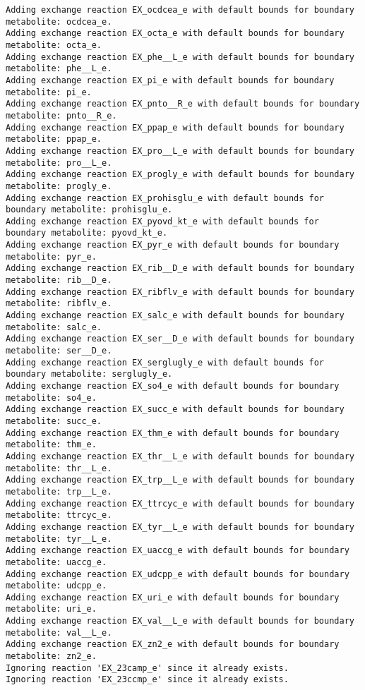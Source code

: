 \documentclass[
  letterpaper,
  DIV=11,
  numbers=noendperiod]{scrartcl}
\begin{document}
\begin{verbatim}
Adding exchange reaction EX_ocdcea_e with default bounds for boundary metabolite: ocdcea_e.
Adding exchange reaction EX_octa_e with default bounds for boundary metabolite: octa_e.
Adding exchange reaction EX_phe__L_e with default bounds for boundary metabolite: phe__L_e.
Adding exchange reaction EX_pi_e with default bounds for boundary metabolite: pi_e.
Adding exchange reaction EX_pnto__R_e with default bounds for boundary metabolite: pnto__R_e.
Adding exchange reaction EX_ppap_e with default bounds for boundary metabolite: ppap_e.
Adding exchange reaction EX_pro__L_e with default bounds for boundary metabolite: pro__L_e.
Adding exchange reaction EX_progly_e with default bounds for boundary metabolite: progly_e.
Adding exchange reaction EX_prohisglu_e with default bounds for boundary metabolite: prohisglu_e.
Adding exchange reaction EX_pyovd_kt_e with default bounds for boundary metabolite: pyovd_kt_e.
Adding exchange reaction EX_pyr_e with default bounds for boundary metabolite: pyr_e.
Adding exchange reaction EX_rib__D_e with default bounds for boundary metabolite: rib__D_e.
Adding exchange reaction EX_ribflv_e with default bounds for boundary metabolite: ribflv_e.
Adding exchange reaction EX_salc_e with default bounds for boundary metabolite: salc_e.
Adding exchange reaction EX_ser__D_e with default bounds for boundary metabolite: ser__D_e.
Adding exchange reaction EX_serglugly_e with default bounds for boundary metabolite: serglugly_e.
Adding exchange reaction EX_so4_e with default bounds for boundary metabolite: so4_e.
Adding exchange reaction EX_succ_e with default bounds for boundary metabolite: succ_e.
Adding exchange reaction EX_thm_e with default bounds for boundary metabolite: thm_e.
Adding exchange reaction EX_thr__L_e with default bounds for boundary metabolite: thr__L_e.
Adding exchange reaction EX_trp__L_e with default bounds for boundary metabolite: trp__L_e.
Adding exchange reaction EX_ttrcyc_e with default bounds for boundary metabolite: ttrcyc_e.
Adding exchange reaction EX_tyr__L_e with default bounds for boundary metabolite: tyr__L_e.
Adding exchange reaction EX_uaccg_e with default bounds for boundary metabolite: uaccg_e.
Adding exchange reaction EX_udcpp_e with default bounds for boundary metabolite: udcpp_e.
Adding exchange reaction EX_uri_e with default bounds for boundary metabolite: uri_e.
Adding exchange reaction EX_val__L_e with default bounds for boundary metabolite: val__L_e.
Adding exchange reaction EX_zn2_e with default bounds for boundary metabolite: zn2_e.
Ignoring reaction 'EX_23camp_e' since it already exists.
Ignoring reaction 'EX_23ccmp_e' since it already exists.

\end{verbatim}
\end{document}
